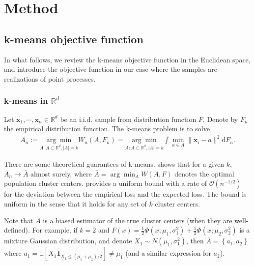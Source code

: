 

\section{Method}




	\subsection{k-means objective function}
		In what follows, we review the k-means objective function in the Euclidean space, and introduce the objective function in our case where the samples are realizations of point processes.

		\subsubsection*{k-means in $\mathbb{R}^d$} 
			Let ${\mathbf{x}_1,\cdots,\mathbf{x}_n}\in \mathbb{R}^d$ be an i.i.d. sample from distribution function $F$. Denote by $F_n$ the empirical distribution function. The k-means problem is to solve  
			\begin{align*}
			A_n:=\underset{A:A\subset \mathbb{R}^d, |A|=k}{\arg\min} W_n(A,F_n)=\underset{A:A\subset \mathbb{R}^d, |A|=k}{\arg\min}\int \min_{a\in A}\|\mathbf{x}_i-a\|^2  \text{d}F_n.
			\end{align*}

			There are some theoretical guarantees of k-means.
			\citet{Pollard1981a} shows that for a given $k$, $A_n\to \bar A $ almost surely, where $\bar A=\arg\min_A W(A,F) $ denotes the optimal population cluster centers.
			\citet{Bachem2017} provides a uniform bound with a rate of $\mathcal{O}\left(n^{-1/2}\right)$ for the deviation between the empirical loss and the expected loss. 
			The bound is uniform in the sense that it holds for any set of $k$ cluster centers.
			
			
			Note that $\bar A$ is a biased estimator of the true cluster centers (when they are well-defined).
			For example, if $k=2$ and $F(x)=\frac{1}{2}\Phi(x;\mu_1,\sigma_1^2)+\frac{1}{2}\Phi(x;\mu_2, \sigma_2^2)$ is a mixture Gaussian distribution, 
			and denote $X_1\sim N(\mu_1,\sigma_1^2)$, then $\bar A= \left\{ a_1,a_2 \right\} $ where $a_1=\mathbb{E}[X_1 \mathbf{1}_{X_1\leq (\mu_1+\mu_2)/2}]\neq \mu_1 $ (and a similar expression for $a_2$).

